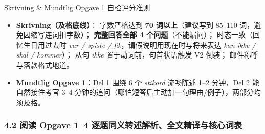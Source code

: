 \begin{tipbox}{Skrivning \& Mundtlig Opgave 1 自检评分准则}
\small
\begin{itemize}
  \item \textbf{Skrivning（及格底线）}： 字数严格达到 \textbf{70 词以上}（建议写到 85--110 词，避免因缩写连词扣字数）； \textbf{完整回答全部 4 个问题}（不能漏问）； 时态一致（回忆生日用过去时 \textit{var / spiste / fik}，请假说明用现在时与将来表达 \textit{kan ikke / skal / kommer}）； 从句 \textit{ikke} 置于动词前，句首状语触发 V2 倒装； 邮件称呼与落款格式地道。
  \item \textbf{Mundtlig Opgave 1}：Del 1 围绕 6 个 \textit{stikord} 流畅陈述 1--2 分钟，Del 2 能自然接住考官 3--4 分钟的追问（哪怕短答后主动加一句理由/例子），两部分均须及格。
\end{itemize}
\end{tipbox}

\subsubsection*{4.2 阅读 Opgave 1--4 逐题同义转述解析、全文精译与核心词表}

